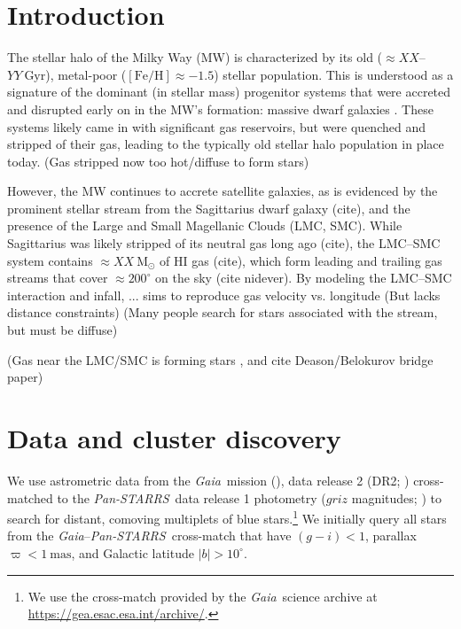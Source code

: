 \documentclass[modern]{aastex62}
\newcommand{\acronym}[1]{{\small{#1}}}
\newcommand{\gaia}{\textsl{Gaia}}
\newcommand{\pans}{\textsl{Pan-STARRS}}
\newcommand{\DR}[1]{\acronym{DR#1}}
\newcommand{\msun}{\textrm{M}_\odot}
\newcommand{\feh}{\ensuremath{[\textrm{Fe} / \textrm{H}]}}
\begin{document}


\section{Introduction} \label{sec:intro}

The stellar halo of the Milky Way (MW) is characterized by its old ($\approx XX$--$YY~\textrm{Gyr}$), metal-poor ($\feh \approx -1.5$) stellar population.
This is understood as a signature of the dominant (in stellar mass) progenitor systems that were accreted and disrupted early on in the MW's formation: massive dwarf galaxies \citep[e.g.,][]{Deason:2015, Fiorentino:2015}.
These systems likely came in with significant gas reservoirs, but were quenched and stripped of their gas, leading to the typically old stellar halo population in place today.
(Gas stripped now too hot/diffuse to form stars)

However, the MW continues to accrete satellite galaxies, as is evidenced by the prominent stellar stream from the Sagittarius dwarf galaxy (cite), and the presence of the Large and Small Magellanic Clouds (LMC, SMC).
While Sagittarius was likely stripped of its neutral gas long ago (cite), the LMC--SMC system contains $\approx XX~\msun$ of HI gas (cite), which form leading and trailing gas streams that cover $\approx 200^\circ$ on the sky (cite nidever).
By modeling the LMC--SMC interaction and infall, ... sims to reproduce gas velocity vs. longitude \citep{Besla:2010}
(But lacks distance constraints)
(Many people search for stars associated with the stream, but must be diffuse)

(Gas near the LMC/SMC is forming stars \citep{Casetti-Dinescu2014,MoniBidin2017}, and cite Deason/Belokurov bridge paper)



\section{Data and cluster discovery} \label{sec:data}

We use astrometric data from the \gaia\ mission (\citealt{Prusti:2016}), data release 2 (\DR{2}; \citealt{Gaia-Collaboration:2018, Lindegren:2018}) cross-matched to the \pans\ data release 1 photometry ($griz$ magnitudes; \citealt{Chambers:2016}) to search for distant, comoving multiplets of blue stars.\footnote{We use the cross-match provided by the \gaia\ science archive at \url{https://gea.esac.esa.int/archive/}.}
We initially query all stars from the \gaia--\pans\ cross-match that have $(g - i) < 1$, parallax $\varpi < 1~\textrm{mas}$, and Galactic latitude $|b| > 10^\circ$. 
\end{document}
